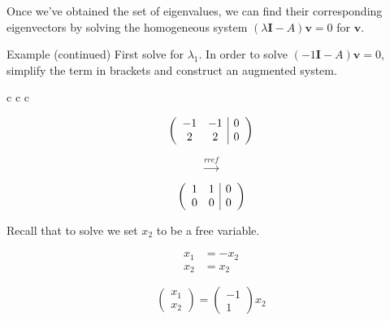 \documentclass[11pt, xcolor={dvipsnames}, hyperref={colorlinks, allcolors=Blue}]{beamer}
\renewcommand{\v}{\mathbf{v}}
\begin{document}
\begin{frame}
Once we've obtained the set of eigenvalues, we can find their corresponding eigenvectors by solving the homogeneous system $(\lambda\mathbf{I}-A)\v = 0$ for $\v$. 

\begin{block}{Example (continued)}
First solve for $\lambda_1$. In order to solve $(-1\mathbf{I} - A)\v = 0$, simplify the term in brackets and construct an augmented system.
\begin{center}
\begin{tabular}{c  c c}
\begin{minipage}{0.2\textwidth}
\[
\left ( 
\begin{array}{c c | c}
-1 & -1 & 0\\ 2 & 2 & 0
\end{array} \right )
\]
\end{minipage}
\quad
\begin{minipage}{0.1\textwidth}
\[ \overset{rref}{\rightarrow}\]
\end{minipage}
\begin{minipage}{0.2\textwidth}
\[
\left ( 
\begin{array}{c c | c}
1 & 1 & 0\\ 0 & 0 & 0
\end{array} \right )
\]
\end{minipage}

\end{tabular}
\end{center}

Recall that to solve we set $x_2$ to be a free variable.

\begin{center}
\begin{minipage}{0.3\textwidth}
\begin{align*}
x_1 &= -x_2\\
x_2 &=x_2
\end{align*}
\end{minipage}
\quad 
\begin{minipage}{0.3\textwidth}
\[
\begin{pmatrix} x_1 \\ x_2 \end{pmatrix}
=
\begin{pmatrix} -1 \\ 1\end{pmatrix}x_2
\]
\end{minipage}
\end{center}
\end{block}
\end{frame}
\end{document}
